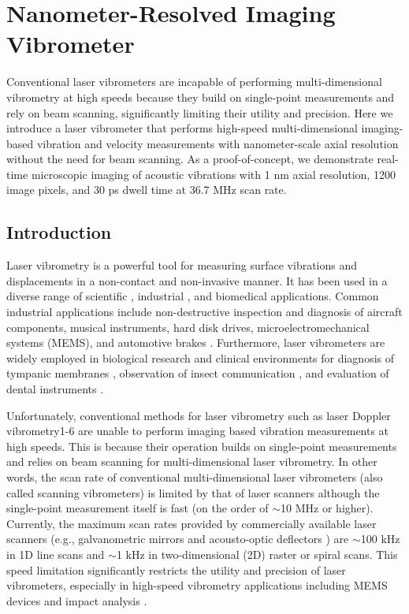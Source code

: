 \chapter{Nanometer-Resolved Imaging Vibrometer}

Conventional laser vibrometers are incapable of performing multi-dimensional vibrometry at high speeds because they build on single-point measurements and rely on beam scanning, significantly limiting their utility and precision. Here we introduce a laser vibrometer that performs high-speed multi-dimensional imaging-based vibration and velocity measurements with nanometer-scale axial resolution without the need for beam scanning. As a proof-of-concept, we demonstrate real-time microscopic imaging of acoustic vibrations with 1 nm axial resolution, 1200 image pixels, and 30 ps dwell time at 36.7 MHz scan rate.

\section{Introduction}

Laser vibrometry is a powerful tool for measuring surface vibrations and displacements in a non-contact and non-invasive manner. It has been used in a diverse range of scientific \cite{castellini2006laser,broch1980mechanical}, industrial \cite{castellini2006laser,broch1980mechanical,drain1980laser,arnott1990laser}, and biomedical \cite{castellini2006laser,drain1980laser,goode1996laser,huber2001evaluation} applications. Common industrial applications include non-destructive inspection and diagnosis of aircraft components, musical instruments, hard disk drives, microelectromechanical systems (MEMS), and automotive brakes \cite{castellini2006laser,broch1980mechanical,drain1980laser}. Furthermore, laser vibrometers are widely employed in biological research and clinical environments for diagnosis of tympanic membranes \cite{goode1996laser,huber2001evaluation}, observation of insect communication \cite{castellini2006laser,drain1980laser}, and evaluation of dental instruments \cite{castellini2006laser,drain1980laser}.

Unfortunately, conventional methods for laser vibrometry such as laser Doppler vibrometry1-6 are unable to perform imaging based vibration measurements at high speeds. This is because their operation builds on single-point measurements and relies on beam scanning for multi-dimensional laser vibrometry. In other words, the scan rate of conventional multi-dimensional laser vibrometers (also called scanning vibrometers) is limited by that of laser scanners although the single-point measurement itself is fast (on the order of $\sim$10 MHz or higher). Currently, the maximum scan rates provided by commercially available laser scanners (e.g., galvanometric mirrors \cite{conant2002micromachined} and acousto-optic deflectors \cite{pape1994design}) are $\sim$100 kHz in 1D line scans and $\sim$1 kHz in two-dimensional (2D) raster or spiral scans. This speed limitation significantly restricts the utility and precision of laser vibrometers, especially in high-speed vibrometry applications including MEMS devices and impact analysis \cite{castellini2006laser,broch1980mechanical,drain1980laser}.

